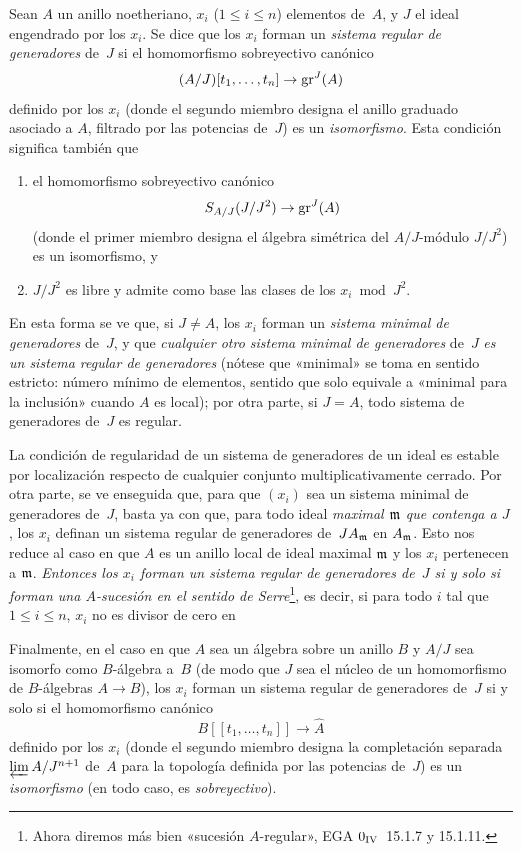 \begin{remarques}
Sean $A$ un anillo noetheriano, $x_i$ ($1\leq i\leq n$) elementos de~$A$, y $J$ el ideal engendrado por los $x_i$. Se dice que los $x_i$ forman un \emph{sistema regular de generadores}
%
%
de~$J$ si el homomorfismo sobreyectivo canónico
\[
(A/J)[t_1,\dots,t_n]\to\operatorname{gr}^J(A)
\]
definido por los $x_i$ (donde el segundo miembro designa el anillo graduado asociado a $A$, filtrado por las potencias de~$J$) es un \emph{isomorfismo}. Esta condición significa también que
\begin{enumerate}
\item[(i)] el homomorfismo sobreyectivo canónico
\[
S_{A/J}(J/J^2)\to\operatorname{gr}^J(A)
\]
(donde el primer miembro designa el álgebra simétrica del $A/J$-módulo $J/J^2$) es un isomorfismo, y
\item[(ii)] $J/J^2$ es libre y admite como base las clases de los $x_i\bmod J^2$.
\end{enumerate}
En esta forma se ve que, si $J\neq A$, los $x_i$ forman un \emph{sistema minimal de generadores} de~$J$, y que \emph{cualquier otro sistema minimal de generadores} de~$J$ \emph{es un sistema regular de generadores} (nótese que «minimal» se toma en sentido estricto: número mínimo de elementos, sentido que solo equivale a «minimal para la inclusión» cuando $A$ es local); por otra parte, si $J=A$, todo sistema de generadores de~$J$ es regular.

La
condición de regularidad de un sistema de generadores de un ideal es estable por localización respecto de cualquier conjunto multiplicativamente cerrado. Por otra parte, se ve enseguida que, para que $(x_i)$ sea un sistema minimal de generadores de~$J$, basta ya con que, para todo ideal \emph{maximal $\mathfrak{m}$ que contenga a $J$}, los $x_i$ definan un sistema regular de generadores de~$JA_{\mathfrak{m}}$ en $A_{\mathfrak{m}}$. Esto nos reduce al caso en que $A$ es un anillo local de ideal maximal $\mathfrak{m}$ y los $x_i$ pertenecen a $\mathfrak{m}$. \emph{Entonces los $x_i$ forman un sistema regular de generadores de~$J$ si y solo si forman una $A$-sucesión en el sentido de Serre}\footnote{Ahora diremos más bien «sucesión $A$-regular», \cf EGA $0_{\textup{IV}}$~15.1.7 y 15.1.11.}, es decir, si para todo $i$ tal que $1\leq i\leq n$, $x_i$ no es divisor de cero en

Finalmente, en el caso en que $A$ sea un álgebra sobre un anillo $B$ y $A/J$ sea isomorfo como $B$-álgebra a~$B$ (de modo que $J$ sea el núcleo de un homomorfismo de $B$-álgebras $A\to B$), los $x_i$ forman un sistema regular de generadores de~$J$ si y solo si el homomorfismo canónico
\[
B[[t_1,\dots,t_n]]\to\hat{A}
\]
definido por los $x_i$ (donde el segundo miembro designa la completación separada $\varprojlim A/J^{n+1}$ de~$A$ para la topología definida por las potencias de~$J$) es un \emph{isomorfismo} (en todo caso, es \emph{sobreyectivo}).


\end{remarques}
